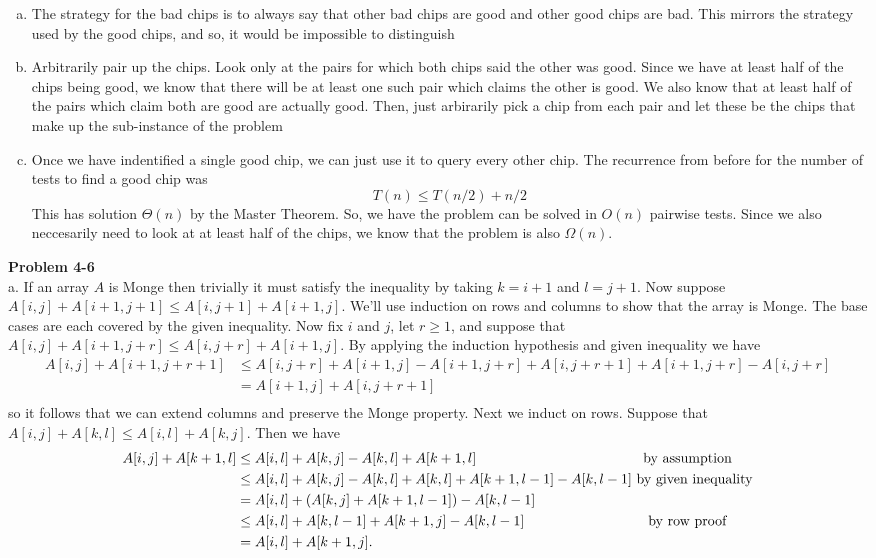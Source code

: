 \documentclass{article}
\begin{document}
\begin{enumerate}[a)]

\item
The strategy for the bad chips is to always say that other bad chips are good and other good chips are bad. This mirrors the strategy used by the good chips, and so, it would be impossible to distinguish

\item
Arbitrarily pair up the chips. Look only at the pairs for which both chips said the other was good. Since we have at least half of the chips being good, we know that there will be at least one such pair which claims the other is good. We also know that at least half of the pairs which claim both are good are actually good. Then, just arbirarily pick a chip from each pair and let these be the chips that make up the sub-instance of the problem

\item
Once we have indentified a single good chip, we can just use it to query every other chip. 
The recurrence from before for the number of tests to find a good chip was
\[
T(n) \le T(n/2) + n/2
\]
This has solution $\Theta(n)$ by the Master Theorem. So, we have the problem can be solved in $O(n)$ pairwise tests. Since we also neccesarily need to look at at least half of the chips, we know that the problem is also $\Omega(n)$.

\end{enumerate}

\noindent\textbf{Problem 4-6}\\

a. If an array $A$ is Monge then trivially it must satisfy the inequality by taking $k = i+1$ and $l = j+1$.  Now suppose $A[i,j] + A[i+1,j+1] \leq A[i,j+1] + A[i+1,j]$.  We'll use induction on rows and columns to show that the array is Monge.  The base cases are each covered by the given inequality.  Now fix $i$ and $j$, let $r \geq 1$, and suppose that $A[i,j] + A[i+1,j+r] \leq A[i,j+r] + A[i+1,j]$.  By applying the induction hypothesis and given inequality we have
\begin{align*}
A[i,j] + A[i+1,j+r+1] &\leq  A[i,j+r] + A[i+1,j] -  A[i+1,j+r] + A[i, j+r+1] + A[i+1, j+r] - A[i, j+r] \\
&=  A[i+1,j] + A[i, j+r+1]  \\
\end{align*}
so it follows that we can extend columns and preserve the Monge property.  Next we induct on rows.  Suppose that $A[i,j] + A[k,l] \leq A[i,l] + A[k,j]$.  Then we have
\begin{align*}
A[i,j] + A[k+1,l] &\leq A[i,l] + A[k,j] - A[k,l] +  A[k+1,l] \hspace{4.2cm} \mbox{by assumption} \\
&\leq  A[i,l] + A[k,j] - A[k,l] + A[k,l] + A[k+1,l-1] - A[k,l-1] \mbox{ by given inequality} \\
&=  A[i,l] + (A[k,j] + A[k+1,l-1]) - A[k,l-1] \\
&\leq A[i,l] + A[k,l-1] + A[k+1,j] - A[k,l-1] \hspace{3cm} \mbox{ by row proof} \\
&= A[i,l] + A[k+1,j].
\end{align*}
\end{document}
